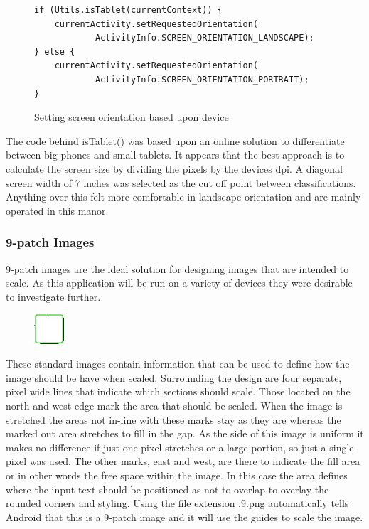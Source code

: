 \begin{figure}[H]
\begin{verbatim}
if (Utils.isTablet(currentContext)) {
    currentActivity.setRequestedOrientation(
            ActivityInfo.SCREEN_ORIENTATION_LANDSCAPE);
} else {
    currentActivity.setRequestedOrientation(
            ActivityInfo.SCREEN_ORIENTATION_PORTRAIT);
}
\end{verbatim}
\caption{Setting screen orientation based upon device}
\label{fig:orientation}
\end{figure}

The code behind isTablet() was based upon an online solution\cite{istablet} to differentiate between big phones and small tablets. It appears that the best approach is to calculate the screen size by dividing the pixels by the devices dpi. A diagonal screen width of 7 inches was selected as the cut off point between classifications. Anything over this felt more comfortable in landscape orientation and are mainly operated in this manor.

\subsubsection*{9-patch Images}
9-patch images are the ideal solution for designing images that are intended to scale. As this application will be run on a variety of devices they were desirable to investigate further.

\begin{figure}
  \includegraphics[width=0.1\textwidth]{Images/input_green.png}
  \caption{}
  \label{fig:patch}
\end{figure}

These standard images contain information that can be used to define how the image should be have when scaled. Surrounding the design are four separate, pixel wide lines that indicate which sections should scale. Those located on the north and west edge mark the area that should be scaled. When the image is stretched the areas not in-line with these marks stay as they are whereas the marked out area stretches to fill in the gap. As the side of this image is uniform it makes no difference if just one pixel stretches or a large portion, so just a single pixel was used. The other marks, east and west, are there to indicate the fill area or in other words the free space within the image. In this case the area defines where the input text should be positioned as not to overlap to overlay the rounded corners and styling. Using the file extension .9.png automatically tells Android that this is a 9-patch image and it will use the guides to scale the image. 

